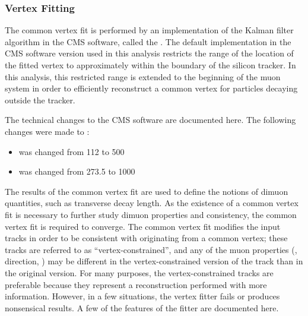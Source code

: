 \subsubsection{Vertex Fitting}
\label{sec:dd:VertexFitting}
The common vertex fit is performed by an implementation of the Kalman filter algorithm in the CMS software, called the  \cite{Fruhwirth:1987fm,Speer:927395}.
The default implementation in the CMS software version used in this analysis restricts the range of the location of the fitted vertex to approximately within the boundary of the silicon tracker.
In this analysis, this restricted range is extended to the beginning of the muon system in order to efficiently reconstruct a common vertex for particles decaying outside the tracker.

The technical changes to the CMS software are documented here.
The following changes were made to :
\begin{itemize}
  \item {} was changed from 112 to 500
  \item {} was changed from 273.5 to 1000
\end{itemize}

The results of the common vertex fit are used to define the notions of dimuon quantities, such as transverse decay length.
As the existence of a common vertex fit is necessary to further study dimuon properties and consistency, the common vertex fit is required to converge.
The common vertex fit modifies the input tracks in order to be consistent with originating from a common vertex; these tracks are referred to as ``vertex-constrained'', and any of the muon properties (\pT, direction, \etc) may be different in the vertex-constrained version of the track than in the original version.
For many purposes, the vertex-constrained tracks are preferable because they represent a reconstruction performed with more information.
However, in a few situations, the vertex fitter fails or produces nonsensical results.
A few of the features of the fitter are documented here.

